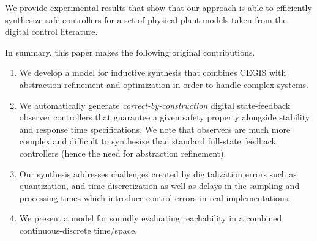 \documentclass[a4paper,UKenglish]{lipics-v2018}
\newcommand{\note}[1]{\textcolor{red}{[#1]}}
\begin{document}

We provide experimental results that show that our approach is able to
efficiently synthesize safe controllers for a set of physical plant models
taken from the digital control literature.

In summary, this paper makes the following original contributions.
%
\begin{enumerate}
%
\item We develop a model for inductive synthesis that combines CEGIS with
  abstraction refinement and optimization in order to handle complex
  systems. 
%
\item We automatically generate \emph{correct-by-construction} digital
  state-feedback observer controllers that guarantee a given safety property
  alongside stability and response time specifications.  We note that
  observers are much more complex and difficult to synthesize than standard
  full-state feedback controllers (hence the need for abstraction refinement).
%
\item  Our synthesis addresses challenges created by digitalization errors
 such as quantization, and time discretization as well as delays in the
 sampling and processing times which introduce control errors in real
 implementations.
 \item We present a model for soundly evaluating reachability in a combined 
 continuous-discrete time/space. 
%
\end{enumerate}


\end{document}

